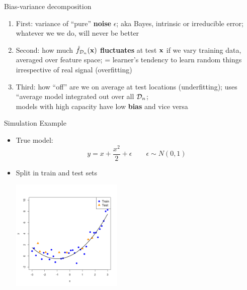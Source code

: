 \documentclass[11pt,compress,t,notes=noshow, xcolor=table]{beamer}
\begin{document}
\begin{vbframe} {Bias-variance decomposition}
\begin{enumerate}
  \item First: variance of ``pure''
     \textbf{noise} $\epsilon$; aka Bayes, intrinsic or irreducible error; 
    whatever we we do, will never be better
  \item Second: how much \textbf{$\hat{f}_{\mathcal{D}_n}(\mathbf{x})$ fluctuates} at test $\mathbf{x}$ if we vary training data, averaged over feature space; = learner's tendency to learn random things irrespective of real signal (overfitting)
  
  \item Third: how ``off'' are we on average at test locations (underfitting); uses ``average model integrated out over all $\mathcal{D}_n$; \\
  models with high capacity have low \textbf{bias} and vice versa
\end{enumerate}


\end{vbframe} 

\begin{vbframe} {Simulation Example}

\begin{itemize}
\item True model:
$$y = x + \frac{x^2}{2} + \epsilon  \qquad \epsilon \sim 
N (0, 1)$$
\item Split in train and test sets 
\begin{center}
  \includegraphics[width = 0.42\textwidth]{figure/bias_variance_decomposition-train_test.png}
\end{center}

\end{itemize}

\end{vbframe} 
\end{document}
